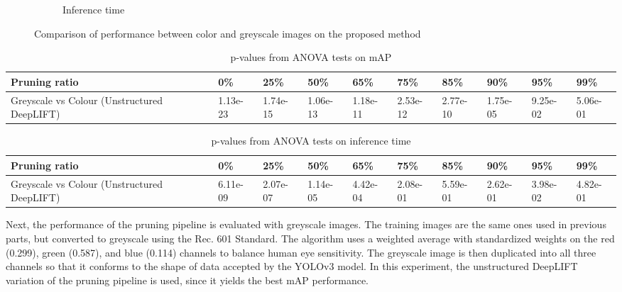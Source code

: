 \documentclass[journal,onecolumn,12pt]{IEEEtran}
\begin{document}
\begin{figure}
\begin{subfigure}[b]{.5\textwidth}
      \caption{Inference time}
      \label{fig:time2}
    \end{subfigure}
    \caption{Comparison of performance between color and greyscale images on the proposed method}
    \label{fig:result2}
\end{figure}

\begin{table}[htbp]
    \caption{p-values from ANOVA tests on mAP}
    \begin{center}
    \begin{tabular}{ |p{3.3cm}|p{1.2cm}|p{1.2cm}|p{1.2cm}|p{1.2cm}|p{1.2cm}|p{1.2cm}|p{1.2cm}|p{1.2cm}|p{1.2cm}|  }
    \hline
    Pruning ratio  & 0\% & 25\%& 50\%& 65\%& 75\%& 85\%& 90\%& 95\%& 99\%\\
     \hline
     Greyscale vs Colour (Unstructured DeepLIFT)      & 1.13e-23& 1.74e-15& 1.06e-13& 1.18e-11& 2.53e-12& 2.77e-10& 1.75e-05& 9.25e-02& 5.06e-01 \\
     \hline
    \end{tabular}
    \end{center}
    \label{tab:p2-mAP}
\end{table}

\begin{table}[htbp]
    \caption{p-values from ANOVA tests on inference time}
    \begin{center}
    \begin{tabular}{ |p{3.3cm}|p{1.2cm}|p{1.2cm}|p{1.2cm}|p{1.2cm}|p{1.2cm}|p{1.2cm}|p{1.2cm}|p{1.2cm}|p{1.2cm}|  }
     \hline
     Pruning ratio  & 0\% & 25\%& 50\%& 65\%& 75\%& 85\%& 90\%& 95\%& 99\%\\
     \hline
     Greyscale vs Colour (Unstructured DeepLIFT)       & 6.11e-09& 2.07e-07& 1.14e-05& 4.42e-04& 2.08e-01& 5.59e-01& 2.62e-01& 3.98e-02& 4.82e-01 \\
     \hline
    \end{tabular}
    \end{center}
    \label{tab:p2-time}
\end{table}


Next, the performance of the pruning pipeline is evaluated with greyscale images. The training images are the same ones used in previous parts, but converted to greyscale using the Rec. 601 Standard. The algorithm uses a weighted average with standardized weights on the red (0.299), green (0.587), and blue (0.114) channels to balance human eye sensitivity. The greyscale image is then duplicated into all three channels so that it conforms to the shape of data accepted by the YOLOv3 model. In this experiment, the unstructured DeepLIFT variation of the pruning pipeline is used, since it yields the best mAP performance.
\end{document}
